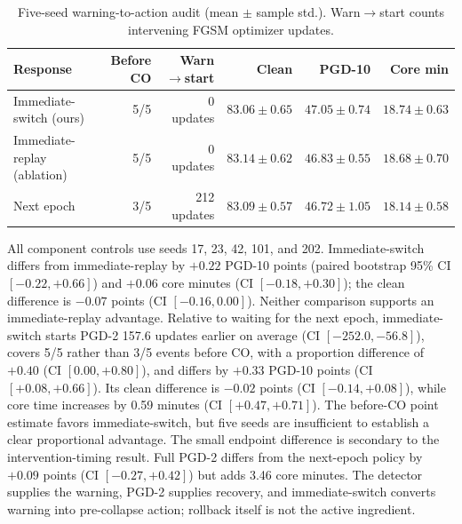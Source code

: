 \begin{table}[t]
\centering
\caption{Five-seed warning-to-action audit (mean $\pm$ sample std.).
Warn$\rightarrow$start counts intervening FGSM optimizer updates.}
\label{tab:timing}
\scriptsize
\setlength{\tabcolsep}{3pt}
\begin{tabular}{lrrrrr}
\toprule
Response & Before CO & Warn$\rightarrow$start & Clean & PGD-10 & Core min \\
\midrule
Immediate-switch (ours) & 5/5 & 0 updates & $83.06\pm0.65$ & $47.05\pm0.74$ & $18.74\pm0.63$ \\
Immediate-replay (ablation) & 5/5 & 0 updates & $83.14\pm0.62$ & $46.83\pm0.55$ & $18.68\pm0.70$ \\
Next epoch & 3/5 & 212 updates & $83.09\pm0.57$ & $46.72\pm1.05$ & $18.14\pm0.58$ \\
\bottomrule
\end{tabular}
\end{table}

All component controls use seeds 17, 23, 42, 101, and 202. Immediate-switch
differs from immediate-replay by $+0.22$ PGD-10 points (paired bootstrap
95\% CI $[-0.22,+0.66]$) and $+0.06$ core minutes (CI
$[-0.18,+0.30]$); the clean difference is $-0.07$ points (CI
$[-0.16,0.00]$). Neither comparison supports an immediate-replay advantage. Relative
to waiting for the next epoch, immediate-switch starts PGD-2 157.6 updates earlier on
average (CI $[-252.0,-56.8]$), covers 5/5 rather than 3/5 events before CO,
with a proportion difference of $+0.40$ (CI $[0.00,+0.80]$), and differs by
$+0.33$ PGD-10 points (CI $[+0.08,+0.66]$). Its clean difference is $-0.02$
points (CI $[-0.14,+0.08]$), while core time increases by 0.59 minutes (CI
$[+0.47,+0.71]$). The before-CO point estimate favors immediate-switch, but five
seeds are insufficient to establish a clear proportional advantage. The small
endpoint difference is secondary to the intervention-timing result. Full PGD-2
differs from the next-epoch policy by $+0.09$ points (CI
$[-0.27,+0.42]$) but adds 3.46 core minutes. The detector supplies the
warning, PGD-2 supplies recovery, and immediate-switch converts warning
into pre-collapse action; rollback itself is not the active ingredient.

